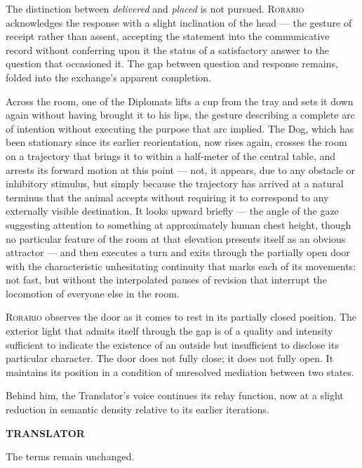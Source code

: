 \documentclass[12pt, oneside]{article}
\newenvironment{action}{%
  \vspace{0.6em}%
  \noindent\ignorespaces%
}{%
  \par\vspace{0.6em}%
}
\newcommand{\character}[1]{%
  \vspace{0.8em}%
  \begin{center}%
    \bfseries\MakeUppercase{#1}%
  \end{center}%
  \vspace{-0.3em}%
}
\newenvironment{dialogue}{%
  \vspace{0.2em}%
  \begin{list}{}{%
    \setlength{\leftmargin}{1.2in}%
    \setlength{\rightmargin}{0.8in}%
    \setlength{\itemsep}{0.6em}%
    \setlength{\parsep}{0pt}%
  }%
}{%
  \end{list}%
  \vspace{0.4em}%
}
\newcommand{\says}[2]{%
  \character{#1}%
  \begin{dialogue}\item #2\end{dialogue}%
}
\begin{document}
\begin{action}
The distinction between \textit{delivered} and \textit{placed} is not pursued. \textsc{Rorario} acknowledges the response with a slight inclination of the head --- the gesture of receipt rather than assent, accepting the statement into the communicative record without conferring upon it the status of a satisfactory answer to the question that occasioned it. The gap between question and response remains, folded into the exchange's apparent completion.

Across the room, one of the Diplomats lifts a cup from the tray and sets it down again without having brought it to his lips, the gesture describing a complete arc of intention without executing the purpose that arc implied. The Dog, which has been stationary since its earlier reorientation, now rises again, crosses the room on a trajectory that brings it to within a half-meter of the central table, and arrests its forward motion at this point --- not, it appears, due to any obstacle or inhibitory stimulus, but simply because the trajectory has arrived at a natural terminus that the animal accepts without requiring it to correspond to any externally visible destination. It looks upward briefly --- the angle of the gaze suggesting attention to something at approximately human chest height, though no particular feature of the room at that elevation presents itself as an obvious attractor --- and then executes a turn and exits through the partially open door with the characteristic unhesitating continuity that marks each of its movements: not fast, but without the interpolated pauses of revision that interrupt the locomotion of everyone else in the room.
\end{action}

\begin{action}
\textsc{Rorario} observes the door as it comes to rest in its partially closed position. The exterior light that admits itself through the gap is of a quality and intensity sufficient to indicate the existence of an outside but insufficient to disclose its particular character. The door does not fully close; it does not fully open. It maintains its position in a condition of unresolved mediation between two states.

Behind him, the Translator's voice continues its relay function, now at a slight reduction in semantic density relative to its earlier iterations.
\end{action}

\says{Translator}{The terms remain unchanged.}
\end{document}
